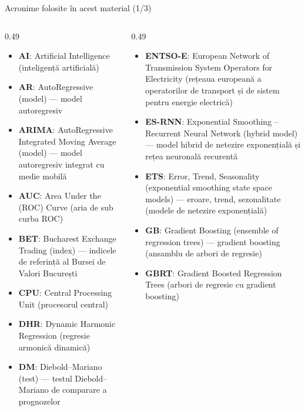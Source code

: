 
{
\begin{frame}[noframenumbering]
    \titlepage
\end{frame}
}
\begin{frame}{Acronime folosite în acest material (1/3)}
\begin{columns}[T]
\begin{column}{0.49\textwidth}
\begin{itemize}\setlength{\itemsep}{0pt}
    \item \textbf{AI}: Artificial Intelligence (inteligență artificială)
    \item \textbf{AR}: AutoRegressive (model) — model autoregresiv
    \item \textbf{ARIMA}: AutoRegressive Integrated Moving Average (model) — model autoregresiv integrat cu medie mobilă
    \item \textbf{AUC}: Area Under the (ROC) Curve (aria de sub curba ROC)
    \item \textbf{BET}: Bucharest Exchange Trading (index) — indicele de referință al Bursei de Valori București
    \item \textbf{CPU}: Central Processing Unit (procesorul central)
    \item \textbf{DHR}: Dynamic Harmonic Regression (regresie armonică dinamică)
    \item \textbf{DM}: Diebold–Mariano (test) — testul Diebold–Mariano de comparare a prognozelor
\end{itemize}
\end{column}
\begin{column}{0.49\textwidth}
\begin{itemize}\setlength{\itemsep}{0pt}
    \item \textbf{ENTSO-E}: European Network of Transmission System Operators for Electricity (rețeaua europeană a operatorilor de transport și de sistem pentru energie electrică)
    \item \textbf{ES-RNN}: Exponential Smoothing – Recurrent Neural Network (hybrid model) — model hibrid de netezire exponențială și rețea neuronală recurentă
    \item \textbf{ETS}: Error, Trend, Seasonality (exponential smoothing state space models) — eroare, trend, sezonalitate (modele de netezire exponențială)
    \item \textbf{GB}: Gradient Boosting (ensemble of regression trees) — gradient boosting (ansamblu de arbori de regresie)
    \item \textbf{GBRT}: Gradient Boosted Regression Trees (arbori de regresie cu gradient boosting)
\end{itemize}
\end{column}
\end{columns}
\end{frame}
